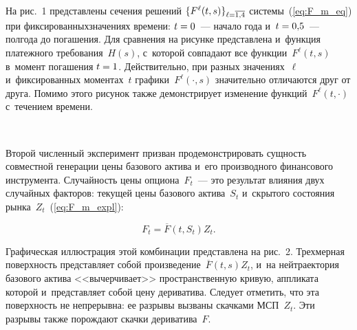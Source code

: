 \begin{multicols}{2}
{}



 
На рис.~1 пред\-став\-ле\-ны сечения решений $\{F^{\ell}(t,s)\}_{\ell\hm=\overline{1,4}}$ сис\-те\-мы~(\ref{eq:F_m_eq}) 
при фиксированных\linebreak значениях времени: $t\hm=0$~--- начало года и~$t\hm=0{,}5$~--- 
полгода до погашения. Для срав\-не\-ния на рисунке пред\-став\-ле\-на и~функция платежного требования~$H(s)$, 
с~которой совпадают все функции~$F^{\ell}(t,s)$  в~момент погашения $t\hm=1$.
Действительно, при  разных значениях~$\ell$ и~фиксированных моментах~$t$ графики~$F^{\ell}(\cdot,s)$ значительно отличаются друг от друга. 
Помимо этого рисунок также демонстрирует изменение функций~$F^{\ell}(t,\cdot)$ с~течением времени.

 \setcounter{figure}{2}
\begin{figure*}[b] %
  \vspace*{-6pt}
\begin{center}
   \mbox{%
\epsfxsize=161.344mm 
}
\end{center}
\vspace*{-11pt}
\label{pic:pic3}
\end{figure*}

Второй численный эксперимент призван продемонстрировать сущ\-ность совместной генерации 
цены базового актива и~его производного финансового инструмента.
Слу\-чай\-ность цены опциона~$F_t$~--- это результат влияния двух случайных факторов: текущей цены базового актива~$S_t$ 
и~скрытого со\-сто\-яния рынка~$Z_t$~(\ref{eq:F_m_expl}):

\vspace*{4pt}

\noindent
$$
F_t = \overline{F}\left(t, S_t\right)Z_t.
$$

\vspace*{-3pt}

\noindent
Графическая иллюстрация этой комбинации пред\-став\-ле\-на на рис.~2. 
Трехмерная по\-верх\-ность пред\-став\-ля\-ет собой произведение~$\overline{F}(t, s)Z_t$,  
и~на ней\linebreak траектория базового актива <<вы\-чер\-чи\-ва\-ет>> про\-стран\-ст\-вен\-ную кривую, 
аппликата которой и~пред\-став\-ля\-ет собой цену дериватива. 
Следует отметить, что эта по\-верх\-ность не непрерывна: ее разрывы вызваны скачками МСП~$Z_t$. 
Эти разрывы  также по\-рож\-да\-ют скач\-ки дериватива~$F$.


\end{multicols}
